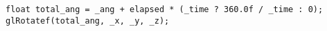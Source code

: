 \begin{lstlisting}
float total_ang = _ang + elapsed * (_time ? 360.0f / _time : 0);
glRotatef(total_ang, _x, _y, _z);
\end{lstlisting}
